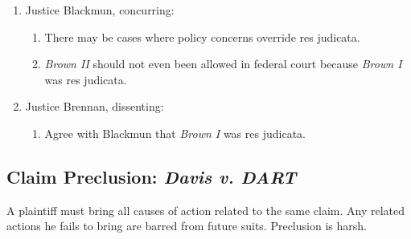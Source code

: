 \begin{enumerate}
\begin{enumerate}
        beyond any individual judge's determination of the equities in a 
        particular case.''\footnote{Casebook p. 1229.}
        \item Reversed.
    \end{enumerate}
    \item Justice Blackmun, concurring:
    \begin{enumerate}
        \item There may be cases where policy concerns override res judicata.
        \item \emph{Brown II} should not even been allowed in federal court 
        because \emph{Brown I} was res judicata.
    \end{enumerate}
    \item Justice Brennan, dissenting:
    \begin{enumerate}
        \item Agree with Blackmun that \emph{Brown I} was res judicata.
    \end{enumerate}
\end{enumerate}

\subsection{Claim Preclusion: \emph{Davis v. DART}}

A plaintiff must bring all causes of action related to the same claim. Any 
related actions he fails to bring are barred from future suits. Preclusion is 
harsh.

